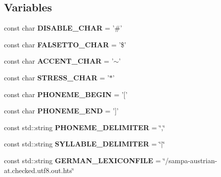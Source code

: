 \subsection*{\-Variables}
\begin{DoxyCompactItemize}
\item 
\hypertarget{namespacesinsy_accc1c0c0db93a53203d8979e8f267aea}{const char {\bfseries \-D\-I\-S\-A\-B\-L\-E\-\_\-\-C\-H\-A\-R} = '\#'}\label{namespacesinsy_accc1c0c0db93a53203d8979e8f267aea}

\item 
\hypertarget{namespacesinsy_ad309b7c0542629af9aa53597247ece94}{const char {\bfseries \-F\-A\-L\-S\-E\-T\-T\-O\-\_\-\-C\-H\-A\-R} = '\$'}\label{namespacesinsy_ad309b7c0542629af9aa53597247ece94}

\item 
\hypertarget{namespacesinsy_a09294d5f72f905013878e00914e39c18}{const char {\bfseries \-A\-C\-C\-E\-N\-T\-\_\-\-C\-H\-A\-R} = '$\sim$'}\label{namespacesinsy_a09294d5f72f905013878e00914e39c18}

\item 
\hypertarget{namespacesinsy_ad3813c47fff7bf563321cd10e9fedebb}{const char {\bfseries \-S\-T\-R\-E\-S\-S\-\_\-\-C\-H\-A\-R} = '$\ast$'}\label{namespacesinsy_ad3813c47fff7bf563321cd10e9fedebb}

\item 
\hypertarget{namespacesinsy_a08628639f91ec76d05f4dd7a00bde67c}{const char {\bfseries \-P\-H\-O\-N\-E\-M\-E\-\_\-\-B\-E\-G\-I\-N} = '\mbox{[}'}\label{namespacesinsy_a08628639f91ec76d05f4dd7a00bde67c}

\item 
\hypertarget{namespacesinsy_a2d04ef6819fc5af5e48634104eab56a2}{const char {\bfseries \-P\-H\-O\-N\-E\-M\-E\-\_\-\-E\-N\-D} = '\mbox{]}'}\label{namespacesinsy_a2d04ef6819fc5af5e48634104eab56a2}

\item 
\hypertarget{namespacesinsy_a5e48902d551130c449be39552a081736}{const std\-::string {\bfseries \-P\-H\-O\-N\-E\-M\-E\-\_\-\-D\-E\-L\-I\-M\-I\-T\-E\-R} = \char`\"{},\char`\"{}}\label{namespacesinsy_a5e48902d551130c449be39552a081736}

\item 
\hypertarget{namespacesinsy_a2b73253e7a43935af2ba1a8b8a374089}{const std\-::string {\bfseries \-S\-Y\-L\-L\-A\-B\-L\-E\-\_\-\-D\-E\-L\-I\-M\-I\-T\-E\-R} = \char`\"{}$|$\char`\"{}}\label{namespacesinsy_a2b73253e7a43935af2ba1a8b8a374089}

\item 
\hypertarget{namespacesinsy_a9c7457ac0d54e11c8049bc2d37520965}{const std\-::string {\bfseries \-G\-E\-R\-M\-A\-N\-\_\-\-L\-E\-X\-I\-C\-O\-N\-F\-I\-L\-E} = \char`\"{}/sampa-\/austrian-\/at.\-checked.\-utf8.\-out.\-hts\char`\"{}}\label{namespacesinsy_a9c7457ac0d54e11c8049bc2d37520965}


\end{DoxyCompactItemize}
